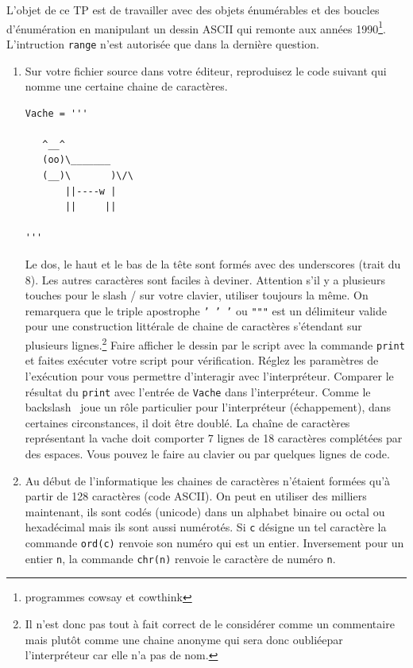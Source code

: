 L'objet de ce TP est de travailler avec des objets énumérables et des boucles d'énumération en manipulant un dessin ASCII qui remonte aux années 1990\footnote{programmes cowsay et cowthink}. L'intruction \texttt{range} n'est autorisée que dans la dernière question. 
\begin{enumerate}
 \item Sur votre fichier source dans votre éditeur, reproduisez le code suivant qui nomme une certaine chaine de caractères.
\begin{verbatim}
Vache = '''
  
   ^__^             
   (oo)\_______     
   (__)\       )\/\ 
       ||----w |    
       ||     ||    
  
'''
\end{verbatim}
Le dos, le haut et le bas de la tête sont formés avec des underscores (trait du 8). Les autres caractères sont faciles à deviner. Attention s'il y a plusieurs touches pour le slash / sur votre clavier, utiliser toujours la même.\newline 
On remarquera que le triple apostrophe \texttt{' ' '} ou \texttt{"""} est un délimiteur valide pour une construction littérale de chaine de caractères s'étendant sur plusieurs lignes.\footnote{Il n'est donc pas tout à fait correct de le considérer comme un commentaire mais plutôt comme une chaine anonyme qui sera donc \og oubliée\fg par l'interpréteur car elle n'a pas de nom.}\newline
Faire afficher le dessin par le script avec la commande \texttt{print} et faites exécuter votre script pour vérification. Réglez les paramètres de l'exécution pour vous permettre d'interagir avec l'interpréteur. Comparer le résultat du \texttt{print} avec l'entrée de \texttt{Vache} dans l'interpréteur. Comme le backslash \ joue un rôle particulier pour l'interpréteur (échappement), dans certaines circonstances, il doit être doublé.\newline
La chaîne de caractères représentant la vache doit comporter 7 lignes de 18 caractères complétées par des espaces. Vous pouvez le faire au clavier ou par quelques lignes de code.
\item Au début de l'informatique les chaines de caractères n'étaient formées qu'à partir de 128 caractères (code ASCII). On peut en utiliser des milliers maintenant, ils sont codés (unicode) dans un alphabet binaire ou octal ou hexadécimal mais ils sont aussi numérotés. Si \texttt{c} désigne un tel caractère la commande \texttt{ord(c)} renvoie son numéro qui est un entier.  Inversement pour un entier \texttt{n}, la commande \texttt{chr(n)} renvoie le caractère de numéro \texttt{n}.

\end{enumerate}
